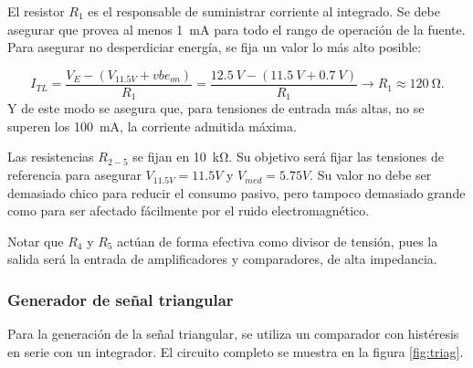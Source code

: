 \documentclass[]{article}
\begin{document}
	El resistor $R_1$ es el responsable de suministrar corriente al integrado. Se debe asegurar que provea al menos \SI{1}{mA} para todo el rango de operación de la fuente. Para asegurar no desperdiciar energía, se fija un valor lo más alto posible:
	
	\begin{equation}
		I_{TL} = \frac{V_E - (V_{11.5V} + vbe_{on})}{R_1} = \frac{\SI{12.5}{V} - (\SI{11.5}{V} + \SI{0.7}{V})}{R_1} \to R_1 \approx \SI{120}{\ohm}.
	\end{equation}
	Y de este modo se asegura que, para tensiones de entrada más altas, no se superen los \SI{100}{mA}, la corriente admitida máxima.
	
	Las resistencias $R_{2-5}$ se fijan en \SI{10}{\kilo\ohm}. Su objetivo será fijar las tensiones de referencia para asegurar $V_{11.5V} = 11.5V$ y $V_{med} = 5.75V$. Su valor no debe ser demasiado chico para reducir el consumo pasivo, pero tampoco demasiado grande como para ser afectado fácilmente por el ruido electromagnético.
	
	Notar que $R_4$ y $R_5$ actúan de forma efectiva como divisor de tensión, pues la salida será la entrada de amplificadores y comparadores, de alta impedancia.
	
	\subsubsection{Generador de señal triangular}
	
	Para la generación de la señal triangular, se utiliza un comparador con histéresis en serie con un integrador. El circuito completo se muestra en la figura \ref{fig:triag}.
	
\end{document}
